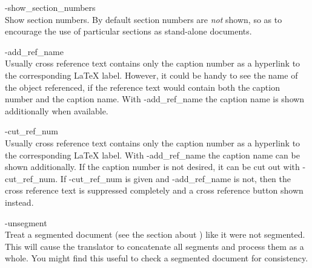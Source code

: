 \begin{htmllist}
%

\item [ -show\_section\_numbers\label{cs_showsecnums}]
\\
Show section numbers. By default section numbers are \emph{not} shown, 
so as to encourage the use of particular sections as stand-alone documents. 

%
\item [ -add\_ref\_name \label{cs_add_ref_name}]
\\
Usually cross reference text contains only the caption number as a
hyperlink to the corresponding \LaTeX{} label. However, it could be
handy to see the name of the object referenced, if the reference text
would contain both the caption number and the caption name.
With -add\_ref\_name the caption name is shown additionally when available.

%
\item [ -cut\_ref\_num \label{cs_cut_ref_num}]
\\
Usually cross reference text contains only the caption number as a
hyperlink to the corresponding \LaTeX{} label. With -add\_ref\_name the
caption name can be shown additionally. If the caption number is not
desired, it can be cut out with -cut\_ref\_num. If -cut\_ref\_num is
given and -add\_ref\_name is not, then the cross reference text is
suppressed completely and a cross reference button shown instead.


\item [ -unsegment\label{cs_unsegment}]
\\
Treat a segmented document (see the section about ) like it were not segmented.
This will cause the translator to concatenate all segments and process
them as a whole.
You might find this useful to check a segmented document for
consistency.
%
\end{htmllist}

